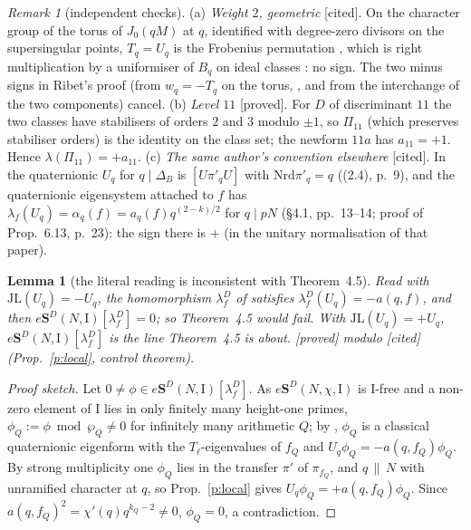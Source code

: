 \documentclass[11pt]{amsart}
\theoremstyle{plain}
\newtheorem{lemma}[proposition]{Lemma}
\theoremstyle{remark}
\newtheorem{remark}[proposition]{Remark}
\newcommand{\I}{\mathrm{I}}
\newcommand{\JL}{\mathrm{JL}}
\newcommand{\Nrd}{\mathrm{Nrd}}
\newcommand{\eS}{e\mathbf{S}}
\newcommand{\st}[1]{\textup{\textsf{[#1]}}}
\begin{document}
\begin{remark}[independent checks]\label{r:checks}
(a) \emph{Weight $2$, geometric} \st{cited}. On the character group of the torus of $J_0(qM)$ at $q$, identified with
degree-zero divisors on the supersingular points, $T_q=U_q$ is the Frobenius permutation \cite[Prop.~3.8(ii),
p.~446]{Rib}, which is right multiplication by a uniformiser of $B_q$ on ideal classes \cite[Rem.~3.5(b), p.~441]{Rib}: no
sign. The two minus signs in Ribet's proof (from $w_q=-T_q$ on the torus, \cite[Prop.~3.7, p.~445]{Rib}, and from the
interchange of the two components) cancel.
(b) \emph{Level $11$} \st{proved}. For $D$ of discriminant $11$ the two classes have stabilisers of orders $2$ and $3$
modulo $\pm1$, so $\Pi_{11}$ (which preserves stabiliser orders) is the identity on the class set; the newform $11a$ has
$a_{11}=+1$. Hence $\lambda(\Pi_{11})=+a_{11}$.
(c) \emph{The same author's convention elsewhere} \st{cited}. In \cite{CH} the quaternionic $U_q$ for $q\mid\Delta_B$ is
$[U\pi'_qU]$ with $\Nrd\pi'_q=q$ ((2.4), p.~9), and the quaternionic eigensystem attached to $f$ has
$\lambda_f(U_q)=\alpha_q(f)=a_q(f)q^{(2-k)/2}$ for $q\mid pN$ (\S4.1, pp.~13--14; proof of Prop.~6.13, p.~23): the sign
there is $+$ (in the unitary normalisation of that paper).
\end{remark}

\begin{lemma}[the literal reading is inconsistent with Theorem~4.5]\label{l:incons}
Read with $\JL(U_q)=-U_q$, the homomorphism $\lambda^D_f$ of \cite[p.~34]{Hs} satisfies $\lambda^D_f(U_q)=-a(q,f)$, and
then $\eS^D(N,\I)[\lambda^D_f]=0$; so Theorem~4.5 would fail. With $\JL(U_q)=+U_q$, $\eS^D(N,\I)[\lambda^D_f]$ is the
line Theorem~4.5 is about. \st{proved} modulo \st{cited} (Prop.~\ref{p:local}, control theorem).
\end{lemma}
\begin{proof}[Proof sketch]
Let $0\ne\phi\in\eS^D(N,\I)[\lambda^D_f]$. As $\eS^D(N,\chi,\I)$ is $\I$-free \cite[Thm.~4.2(1), p.~32]{Hs} and a non-zero
element of $\I$ lies in only finitely many height-one primes, $\phi_Q:=\phi\bmod\wp_Q\ne0$ for infinitely many arithmetic
$Q$; by \cite[Thm.~4.2(2)]{Hs}, $\phi_Q$ is a classical quaternionic eigenform with the $T_\ell$-eigenvalues of $f_Q$ and
$U_q\phi_Q=-a(q,f_Q)\phi_Q$. By strong multiplicity one $\phi_Q$ lies in the transfer $\pi'$ of $\pi_{f_Q}$, and $q\,\|\,N$
with unramified character at $q$, so Prop.~\ref{p:local} gives $U_q\phi_Q=+a(q,f_Q)\phi_Q$. Since $a(q,f_Q)^2=
\chi'(q)q^{k_Q-2}\ne0$, $\phi_Q=0$, a contradiction.
\end{proof}
\end{document}
